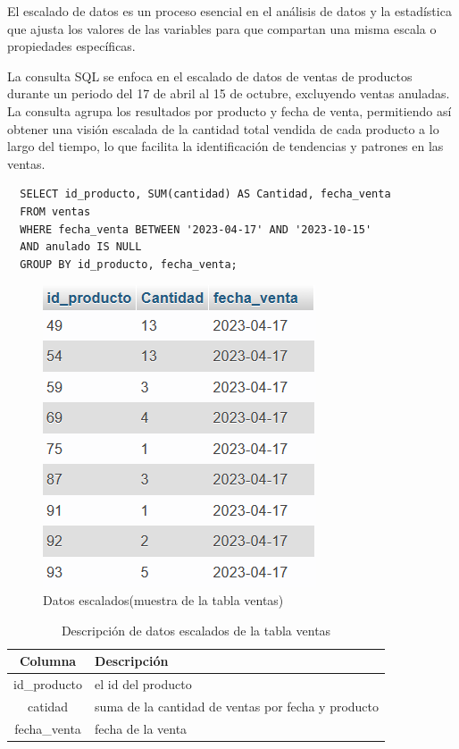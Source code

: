 El escalado de datos es un proceso esencial en el análisis de datos y la estadística que ajusta los valores de las variables para que compartan una misma escala o propiedades específicas.

\vspace{1\baselineskip}
La consulta SQL se enfoca en el escalado de datos de ventas de productos durante un periodo del 17 de abril al 15 de octubre, excluyendo ventas anuladas. La consulta agrupa los resultados por producto y fecha de venta, permitiendo así obtener una visión escalada de la cantidad total vendida de cada producto a lo largo del tiempo, lo que facilita la identificación de tendencias y patrones en las ventas.

\begin{verbatim}
  SELECT id_producto, SUM(cantidad) AS Cantidad, fecha_venta
  FROM ventas
  WHERE fecha_venta BETWEEN '2023-04-17' AND '2023-10-15'
  AND anulado IS NULL
  GROUP BY id_producto, fecha_venta;
\end{verbatim}

\begin{figure}[H]
  \begin{center}
    \includegraphics[scale=0.90]{./escalado.png}
    \caption{Datos escalados(muestra de la tabla ventas)}
    \label{fig:escalado}
  \end{center}
\end{figure}

\begin{table}[H]

  \begin{tabular}{|c|l|}  %
    \hline
    \rowcolor{gray!50} \textbf{Columna} & \textbf{Descripción}                               \\
    \hline
    id\_producto                        & el id del producto                                 \\
    catidad                             & suma de la cantidad de ventas por fecha y producto \\
    fecha\_venta                        & fecha de la venta                                  \\
    \hline
  \end{tabular}
  \centering
  \caption{ Descripción de datos escalados de la tabla ventas }
  \label{tab:tabla_scalada} %
\end{table}


